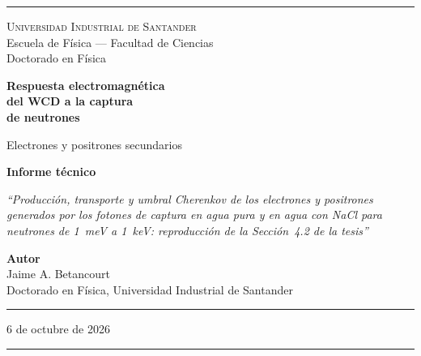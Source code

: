 \documentclass[11pt,a4paper]{article}
\begin{document}
\pagestyle{empty}


\begin{titlepage}
\begin{center}
\vspace*{0.5cm}
\textcolor{reglaColor}{\rule{\linewidth}{1.2pt}}

\vspace{1.3cm}
{\Large\scshape Universidad Industrial de Santander}\\[0.2cm]
{\large Escuela de Física --- Facultad de Ciencias}\\[0.2cm]
{\large Doctorado en Física}

\vspace{2.2cm}
{\Huge\bfseries\color{tituloColor} Respuesta electromagnética\\[0.3cm] del WCD a la captura\\[0.3cm] de neutrones}

\vspace{1.2cm}
{\Large Electrones y positrones secundarios}

\vspace{1.4cm}
{\large\textbf{Informe técnico}}

\vspace{0.6cm}
\begin{minipage}{0.82\linewidth}
\centering
\textit{``Producción, transporte y umbral Cherenkov de los electrones y positrones generados por los fotones de captura en agua pura y en agua con NaCl para neutrones de 1~meV a 1~keV: reproducción de la Sección~4.2 de la tesis''}
\end{minipage}

\vfill
{\large\textbf{Autor}}\\[0.15cm]
Jaime A. Betancourt\\[0.1cm]
Doctorado en Física, Universidad Industrial de Santander

\vspace{1.2cm}
\textcolor{reglaColor}{\rule{0.5\linewidth}{0.6pt}}

\vspace{1cm}
6 de octubre de 2026

\vspace{1cm}
\textcolor{reglaColor}{\rule{\linewidth}{1.2pt}}
\end{center}
\end{titlepage}

\pagestyle{plain}
\end{document}
